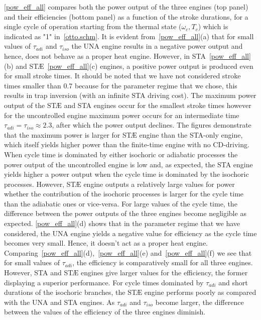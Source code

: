 \documentclass[aps,pra,twocolumn,showpacs,showkeys,groupedaddress,nobalancelastpage,nofootinbib,floatfix,superscriptaddress,longbibliography]{revtex4-2}
\begin{document}
\cref{pow_eff_all} compares both the power output of the three engines (top panel) and their efficiencies (bottom panel) as a function of the stroke durations, for a single cycle of operation starting from the thermal state ($\omega_c,T_c$) which is indicated as "1" in~\cref{otto.schm}. It is evident from~\cref{pow_eff_all}(a) that for small values of $\tau_{adi}$ and $\tau_{iso}$ the UNA engine results in a negative power output and hence, does not behave as a proper heat engine. However, in STA~\cref{pow_eff_all}(b) and ST{\AE}~\cref{pow_eff_all}(c) engines, a positive power output is produced even for small stroke times. It should be noted that we have not considered stroke times smaller than 0.7 because for the parameter regime that we chose, this results in trap inversion (with an infinite STA driving cost). The maximum power output of the ST{\AE} and STA engines occur for the smallest stroke times however for the uncontrolled engine maximum power occurs for an intermediate time $\tau_{adi}=\tau_{iso}\approx 2.3$, after which the power output declines. The figures demonstrate that the maximum power is larger for ST{\AE} engine than the STA-only engine, which itself yields higher power than the finite-time engine with no CD-driving. 
When cycle time is dominated by either isochoric or adiabatic processes the power output of the uncontrolled engine is low and, as expected, the STA engine yields higher a power output when the cycle time is dominated by the isochoric processes. However, ST{\AE} engine outputs a relatively large values for power whether the contribution of the isochoric processes is larger for the cycle time than the adiabatic ones or vice-versa. For large values of the cycle time, the difference between the power outputs of the three engines become negligible as expected.
\cref{pow_eff_all}(d) shows that in the parameter regime that we have considered, the UNA engine yields a negative value for efficiency as the cycle time becomes very small. Hence, it doesn't act as a proper heat engine. Comparing~\cref{pow_eff_all}(d),~\cref{pow_eff_all}(e) and~\cref{pow_eff_all}(f) we see that for small values of $\tau_{adi}$, the efficiency is comparatively small for all three engines. However, STA and ST{\AE} engines give larger values for the efficiency, the former displaying a superior performance. For cycle times dominated by $\tau_{adi}$ and short durations of the isochoric branches, the ST{\AE} engine performs poorly as compared with the UNA and STA engines. As $\tau_{adi}$ and $\tau_{iso}$ become larger, the difference between the values of the efficiency of the three engines diminish.
\end{document}
